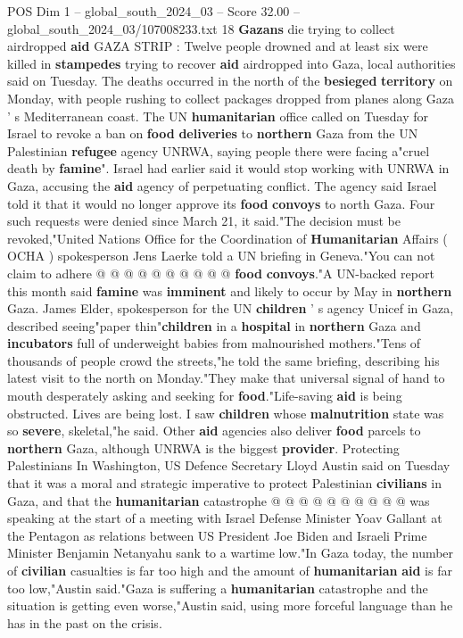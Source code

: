 \begin{textsample}{POS Dim 1 – global\_south\_2024\_03 – Score 32.00 – global\_south\_2024\_03/107008233.txt}  \label{ex:f1_pos_013}
18 \textbf{Gazans} die trying to collect airdropped \textbf{aid} GAZA STRIP : Twelve people drowned and at least six were killed in \textbf{stampedes} trying to recover \textbf{aid} airdropped into Gaza, local authorities said on Tuesday.
The deaths occurred in the north of the \textbf{besieged} \textbf{territory} on Monday, with people rushing to collect packages dropped from planes along Gaza ' s Mediterranean coast.
The UN \textbf{humanitarian} office called on Tuesday for Israel to revoke a ban on \textbf{food} \textbf{deliveries} to \textbf{northern} Gaza from the UN Palestinian \textbf{refugee} agency UNRWA, saying people there were facing a"cruel death by \textbf{famine}".
Israel had earlier said it would stop working with UNRWA in Gaza, accusing the \textbf{aid} agency of perpetuating conflict.
The agency said Israel told it that it would no longer approve its \textbf{food} \textbf{convoys} to north Gaza.
Four such requests were denied since March 21, it said."The decision must be revoked,"United Nations Office for the Coordination of \textbf{Humanitarian} Affairs ( OCHA ) spokesperson Jens Laerke told a UN briefing in Geneva."You can not claim to adhere @ @ @ @ @ @ @ @ @ @ \textbf{food} \textbf{convoys}."A UN-backed report this month said \textbf{famine} was \textbf{imminent} and likely to occur by May in \textbf{northern} Gaza.
James Elder, spokesperson for the UN \textbf{children} ' s agency Unicef in Gaza, described seeing"paper thin"\textbf{children} in a \textbf{hospital} in \textbf{northern} Gaza and \textbf{incubators} full of underweight babies from malnourished mothers."Tens of thousands of people crowd the streets,"he told the same briefing, describing his latest visit to the north on Monday."They make that universal signal of hand to mouth desperately asking and seeking for \textbf{food}."Life-saving \textbf{aid} is being obstructed.
Lives are being lost.
I saw \textbf{children} whose \textbf{malnutrition} state was so \textbf{severe}, skeletal,"he said.
Other \textbf{aid} agencies also deliver \textbf{food} parcels to \textbf{northern} Gaza, although UNRWA is the biggest \textbf{provider}.
Protecting Palestinians In Washington, US Defence Secretary Lloyd Austin said on Tuesday that it was a moral and strategic imperative to protect Palestinian \textbf{civilians} in Gaza, and that the \textbf{humanitarian} catastrophe @ @ @ @ @ @ @ @ @ @ was speaking at the start of a meeting with Israel Defense Minister Yoav Gallant at the Pentagon as relations between US President Joe Biden and Israeli Prime Minister Benjamin Netanyahu sank to a wartime low."In Gaza today, the number of \textbf{civilian} casualties is far too high and the amount of \textbf{humanitarian} \textbf{aid} is far too low,"Austin said."Gaza is suffering a \textbf{humanitarian} catastrophe and the situation is getting even worse,"Austin said, using more forceful language than he has in the past on the crisis.

\end{textsample}
